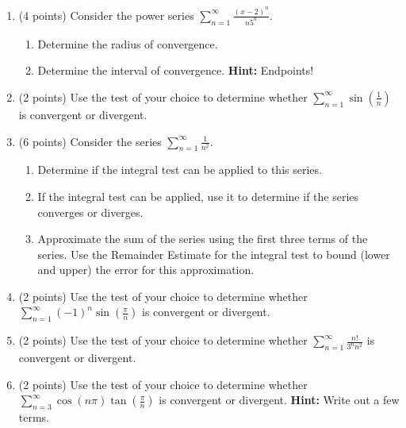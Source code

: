 \documentclass[paper=a4, fontsize=11pt]{scrartcl} %
\numberwithin{equation}{section} %
\numberwithin{figure}{section} %
\numberwithin{table}{section} %
\begin{document}
\begin{enumerate}
\item (4 points) Consider the power series $\sum\limits_{n=1}^\infty \frac{(x-2)^n}{n5^n}$.
\begin{enumerate}
\item Determine the radius of convergence.
 \vspace{3.5in}
\item Determine the interval of convergence. \textbf{Hint:} Endpoints!
\end{enumerate}
\newpage
\item (2 points) Use the test of your choice to determine whether 
$\sum\limits_{n=1}^\infty \sin \left( \frac{1}{n} \right)$ is convergent or divergent.

\newpage

\item (6 points) Consider the series $\sum\limits_{n=1}^\infty \frac{1}{n^2}$.
\begin{enumerate}
\item Determine if the integral test can be applied to this series.
\vspace{3.5in}
\item If the integral test can be applied, use it to determine if the series converges or diverges.
\newpage
\item Approximate the sum of the series using the first three terms of the series. Use the Remainder Estimate for the integral test to bound (lower and upper) the error for this approximation.
\end{enumerate}

\vspace{3.5in}

\item (2 points) Use the test of your choice to determine whether 
$\sum\limits_{n=1}^\infty (-1)^n \sin \left( \frac{\pi}{n} \right)$ is convergent or divergent.

\newpage

\item (2 points) Use the test of your choice to determine whether 
$\sum\limits_{n=1}^\infty \frac{n!}{3^n n^2}$ is convergent or divergent.

\newpage

\item (2 points) Use the test of your choice to determine whether 
$\sum\limits_{n=3}^\infty \cos (n \pi) \tan (\frac{\pi}{n})$ is convergent or divergent. \textbf{Hint:} Write out a few terms.


\end{enumerate}
\end{document}
